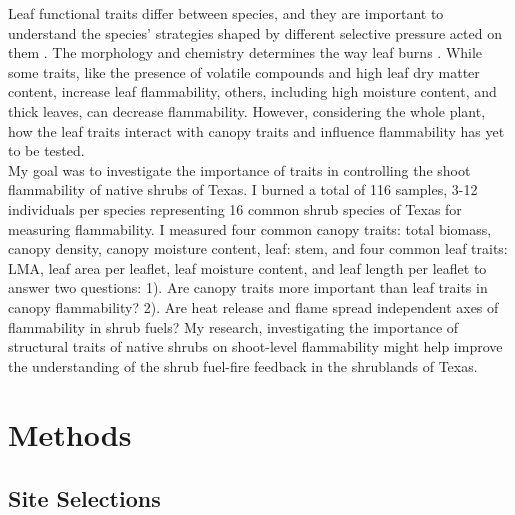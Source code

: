 \documentclass[12pt]{report}
\begin{document}
Leaf functional traits differ between species, and they are important to understand the species' strategies shaped by different selective pressure acted on them \citep{wright2004worldwide}. The morphology and chemistry
determines the way leaf burns \citep{anderson1970forest, owens1998seasonal, schwilk2011scaling, pausas2016secondary, guerrero2021leaf, ganteaume2021volatile,alam2020shoot}. While some traits, like the presence of volatile compounds and high leaf dry matter content, increase leaf flammability, others, including high moisture content, and thick leaves, can decrease flammability. However, considering the whole plant, how the leaf traits interact with canopy traits and influence flammability has yet to be tested.\\

My goal was to investigate the importance of traits in controlling the shoot flammability of native shrubs of Texas. I burned a total of 116 samples, 3-12 individuals per species representing 16 common shrub species of Texas for measuring flammability. I measured four common canopy traits: total biomass, canopy density, canopy moisture content, leaf: stem, and four common leaf traits: LMA, leaf area per leaflet, leaf moisture content, and leaf length per leaflet to answer two questions: 1). Are canopy traits more important than leaf traits in canopy flammability? 2). Are heat release and flame spread independent axes of flammability in shrub fuels? My research, investigating the importance of structural traits of native shrubs on shoot-level flammability might help improve the understanding of the shrub fuel-fire feedback in the shrublands of Texas.


\section{Methods}
\subsection{Site Selections}
\end{document}
